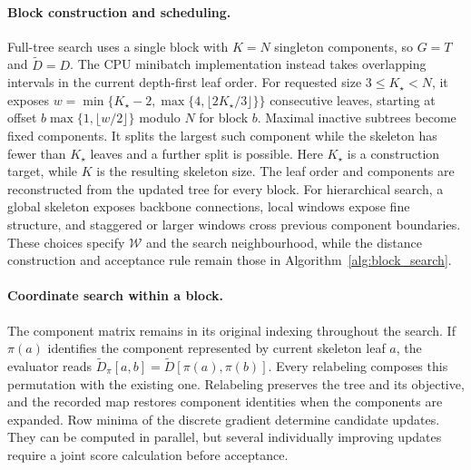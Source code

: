 \documentclass[11pt,a4paper]{article}
\makeatletter
\DeclareRobustCommand{\_}{\ifmmode\nfss@text{\textunderscore}\else\textunderscore\allowbreak\fi}
\theoremstyle{definition}
\makeatother
\begin{document}
\paragraph{Block construction and scheduling.}
Full-tree search uses a single block with $K=N$ singleton components, so $G=T$ and $\widetilde D=D$.
The CPU minibatch implementation instead takes overlapping intervals in the current depth-first leaf order.
For requested size $3\leq K_\star<N$, it exposes
$w=\min\{K_\star-2,\max\{4,\lfloor2K_\star/3\rfloor\}\}$
consecutive leaves, starting at offset $b\max\{1,\lfloor w/2\rfloor\}$ modulo $N$ for block $b$.
Maximal inactive subtrees become fixed components.
It splits the largest such component while the skeleton has fewer than $K_\star$ leaves and a further split is possible.
Here $K_\star$ is a construction target, while $K$ is the resulting skeleton size.
The leaf order and components are reconstructed from the updated tree for every block.
For hierarchical search, a global skeleton exposes backbone connections, local windows expose fine structure, and staggered or larger windows cross previous component boundaries.
These choices specify $\mathcal W$ and the search neighbourhood, while the distance construction and acceptance rule remain those in Algorithm~\ref{alg:block_search}.

\paragraph{Coordinate search within a block.}
The component matrix remains in its original indexing throughout the search.
If $\pi(a)$ identifies the component represented by current skeleton leaf $a$, the evaluator reads
$\widetilde D_\pi[a,b]=\widetilde D[\pi(a),\pi(b)]$.
Every relabeling composes this permutation with the existing one.
Relabeling preserves the tree and its objective, and the recorded map restores component identities when the components are expanded.
Row minima of the discrete gradient determine candidate updates.
They can be computed in parallel, but several individually improving updates require a joint score calculation before acceptance.
\end{document}
